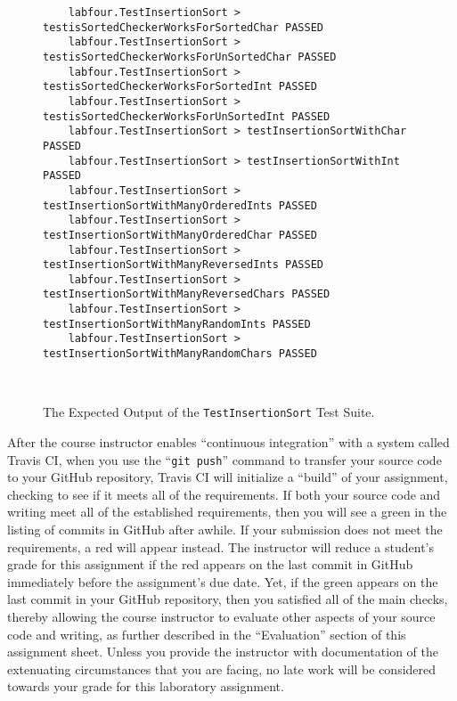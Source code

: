 \documentclass[11pt]{article}
\newcommand{\testprogram}{\lstinline{TestInsertionSort}}
\newcommand{\gitpush}{\command{git push}}
\newcommand{\command}[1]{``\lstinline{#1}''}
\newcommand{\step}[1]{``{#1}''}
\newcommand{\checkmark}{\ding{51}}
\newcommand{\naughtmark}{\ding{55}}
\begin{document}
\begin{figure}[t]
  \centering
  \begin{verbatim}
    labfour.TestInsertionSort > testisSortedCheckerWorksForSortedChar PASSED
    labfour.TestInsertionSort > testisSortedCheckerWorksForUnSortedChar PASSED
    labfour.TestInsertionSort > testisSortedCheckerWorksForSortedInt PASSED
    labfour.TestInsertionSort > testisSortedCheckerWorksForUnSortedInt PASSED
    labfour.TestInsertionSort > testInsertionSortWithChar PASSED
    labfour.TestInsertionSort > testInsertionSortWithInt PASSED
    labfour.TestInsertionSort > testInsertionSortWithManyOrderedInts PASSED
    labfour.TestInsertionSort > testInsertionSortWithManyOrderedChar PASSED
    labfour.TestInsertionSort > testInsertionSortWithManyReversedInts PASSED
    labfour.TestInsertionSort > testInsertionSortWithManyReversedChars PASSED
    labfour.TestInsertionSort > testInsertionSortWithManyRandomInts PASSED
    labfour.TestInsertionSort > testInsertionSortWithManyRandomChars PASSED
  \end{verbatim}
  \vspace*{-.35in}
  \caption{The Expected Output of the \testprogram{} Test Suite.}~\label{fig:test}
  \vspace*{-.25in}
\end{figure}

After the course instructor enables \step{continuous integration} with a system
called Travis CI, when you use the \gitpush{} command to transfer your source
code to your GitHub repository, Travis CI will initialize a \step{build} of your
assignment, checking to see if it meets all of the requirements. If both your
source code and writing meet all of the established requirements, then you will
see a green \checkmark{} in the listing of commits in GitHub after awhile. If
your submission does not meet the requirements, a red \naughtmark{} will appear
instead. The instructor will reduce a student's grade for this assignment if the
red \naughtmark{} appears on the last commit in GitHub immediately before the
assignment's due date. Yet, if the green \checkmark{} appears on the last commit
in your GitHub repository, then you satisfied all of the main checks, thereby
allowing the course instructor to evaluate other aspects of your source code and
writing, as further described in the \step{Evaluation} section of this
assignment sheet. Unless you provide the instructor with documentation of the
extenuating circumstances that you are facing, no late work will be considered
towards your grade for this laboratory assignment.
\end{document}
